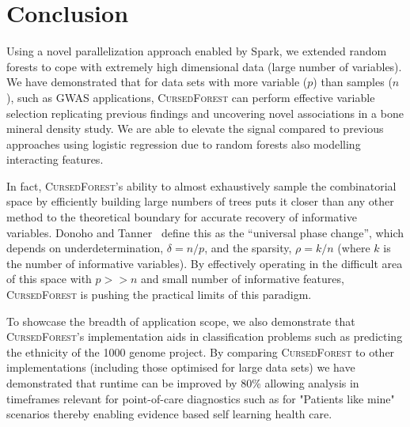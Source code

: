\documentclass[10pt,letterpaper]{article}
\newcommand{\cursedforest}{\textsc{CursedForest}\xspace}
\newcommand{\mtry}{\texttt{mtry}\xspace}
\begin{document}




\section{Conclusion}

Using a novel parallelization approach enabled by Spark, we extended random forests to cope with extremely high dimensional data (large number of variables). 
We have demonstrated that for data sets with more variable ($p$) than samples ($n$), such as GWAS applications, \cursedforest can perform effective variable selection replicating previous findings and uncovering novel associations in a bone mineral density study. 
We are able to elevate the signal compared to previous approaches using logistic regression due to random forests also modelling interacting features.

In fact, \cursedforest's ability to almost exhaustively sample the combinatorial space by efficiently building large numbers of trees puts it closer than any other method to the theoretical boundary for accurate recovery of informative variables. Donoho and Tanner~\cite{Donoho.and.Tanner.2009} define this as the ``universal phase change'', which depends on underdetermination, $\delta = n/p$, and the sparsity, $\rho =k/n$ (where $k$ is the number of informative variables). 
By effectively operating in the difficult area of this space with $p >> n$ and small number of informative features, \cursedforest is pushing the practical limits of this paradigm. 

To showcase the breadth of application scope, we also demonstrate that \cursedforest's implementation aids in classification problems such as predicting the ethnicity of the 1000 genome project. 
By comparing \cursedforest to other implementations (including those optimised for large data sets) we have demonstrated that runtime can be improved by 80\% allowing analysis in timeframes relevant for point-of-care diagnostics such as for "Patients like mine" scenarios thereby enabling evidence based self learning health care. 
\end{document}

